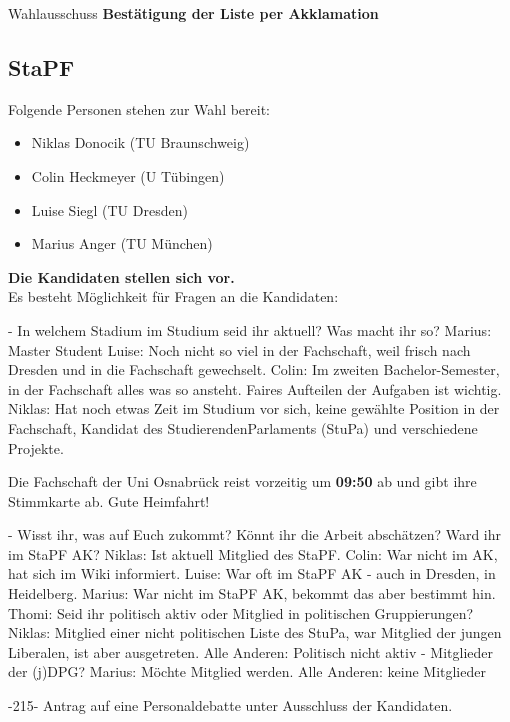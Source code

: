     \begin{success}{Wahlausschuss}
      \textbf{Bestätigung der Liste per Akklamation}
    \end{success}

  \subsection{StaPF}
    Folgende Personen stehen zur Wahl bereit:
    \begin{itemize}
      \item Niklas Donocik (TU Braunschweig)
      \item Colin Heckmeyer (U Tübingen)
      \item Luise Siegl (TU Dresden)
      \item Marius Anger (TU München)
    \end{itemize}

    \textbf{Die Kandidaten stellen sich vor.} \\

    Es besteht Möglichkeit für Fragen an die Kandidaten:
    \begin{outline}
      - In welchem Stadium im Studium seid ihr aktuell? Was macht ihr so?
        \2 Marius: Master Student
        \2 Luise: Noch nicht so viel in der Fachschaft, weil frisch nach Dresden und in die Fachschaft gewechselt.
        \2 Colin: Im zweiten Bachelor-Semester, in der Fachschaft alles was so ansteht. Faires Aufteilen der Aufgaben ist wichtig.
        \2 Niklas: Hat noch etwas Zeit im Studium vor sich, keine gewählte Position in der Fachschaft, Kandidat des StudierendenParlaments (StuPa) und verschiedene Projekte.
    \end{outline}

    \begin{info}{}
      Die Fachschaft der Uni Osnabrück reist vorzeitig um \textbf{09:50} ab und gibt ihre Stimmkarte ab. Gute Heimfahrt!
    \end{info}

    \begin{outline}
      - Wisst ihr, was auf Euch zukommt? Könnt ihr die Arbeit abschätzen? Ward ihr im StaPF AK?
        \2 Niklas: Ist aktuell Mitglied des StaPF.
        \2 Colin: War nicht im AK, hat sich im Wiki informiert.
        \2 Luise: War oft im StaPF AK - auch in Dresden, in Heidelberg.
        \2 Marius: War nicht im StaPF AK, bekommt das aber bestimmt hin.
      \1 Thomi: Seid ihr politisch aktiv oder Mitglied in politischen Gruppierungen?
        \2 Niklas: Mitglied einer nicht politischen Liste des StuPa, war Mitglied der jungen Liberalen, ist aber ausgetreten.
        \2 Alle Anderen: Politisch nicht aktiv
      - Mitglieder der (j)DPG?
        \2 Marius: Möchte Mitglied werden.
        \2 Alle Anderen: keine Mitglieder
    \end{outline}
    -215- Antrag auf eine Personaldebatte unter Ausschluss der Kandidaten.

